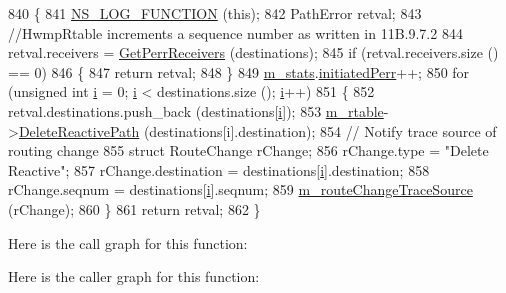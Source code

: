 \begin{DoxyCode}
840 \{
841   \hyperlink{log-macros-disabled_8h_a90b90d5bad1f39cb1b64923ea94c0761}{NS\_LOG\_FUNCTION} (\textcolor{keyword}{this});
842   PathError retval;
843   \textcolor{comment}{//HwmpRtable increments a sequence number as written in 11B.9.7.2}
844   retval.receivers = \hyperlink{classns3_1_1dot11s_1_1HwmpProtocol_ae0b4e176bf1e9251f6637794dbfbd6cb}{GetPerrReceivers} (destinations);
845   \textcolor{keywordflow}{if} (retval.receivers.size () == 0)
846     \{
847       \textcolor{keywordflow}{return} retval;
848     \}
849   \hyperlink{classns3_1_1dot11s_1_1HwmpProtocol_a478a13e7ec9ca167a5b13b38237d17ae}{m\_stats}.\hyperlink{structns3_1_1dot11s_1_1HwmpProtocol_1_1Statistics_adfc0a8fb77c92acd199b86028dcd7dfb}{initiatedPerr}++;
850   \textcolor{keywordflow}{for} (\textcolor{keywordtype}{unsigned} \textcolor{keywordtype}{int} \hyperlink{bernuolliDistribution_8m_a6f6ccfcf58b31cb6412107d9d5281426}{i} = 0; \hyperlink{bernuolliDistribution_8m_a6f6ccfcf58b31cb6412107d9d5281426}{i} < destinations.size (); \hyperlink{bernuolliDistribution_8m_a6f6ccfcf58b31cb6412107d9d5281426}{i}++)
851     \{
852       retval.destinations.push\_back (destinations[\hyperlink{bernuolliDistribution_8m_a6f6ccfcf58b31cb6412107d9d5281426}{i}]);
853       \hyperlink{classns3_1_1dot11s_1_1HwmpProtocol_a12fda0e3e5a400888c8ba1a87c1a7216}{m\_rtable}->\hyperlink{classns3_1_1dot11s_1_1HwmpRtable_a1d23ed62cf717efb132d9647d0fd1734}{DeleteReactivePath} (destinations[i].destination);
854       \textcolor{comment}{// Notify trace source of routing change}
855       \textcolor{keyword}{struct }RouteChange rChange;
856       rChange.type = \textcolor{stringliteral}{"Delete Reactive"};
857       rChange.destination = destinations[\hyperlink{bernuolliDistribution_8m_a6f6ccfcf58b31cb6412107d9d5281426}{i}].destination;
858       rChange.seqnum = destinations[\hyperlink{bernuolliDistribution_8m_a6f6ccfcf58b31cb6412107d9d5281426}{i}].seqnum;
859       \hyperlink{classns3_1_1dot11s_1_1HwmpProtocol_aff5ca87b57430809a6b6ee25fa526948}{m\_routeChangeTraceSource} (rChange);
860     \}
861   \textcolor{keywordflow}{return} retval;
862 \}
\end{DoxyCode}


Here is the call graph for this function\+:




Here is the caller graph for this function\+:


